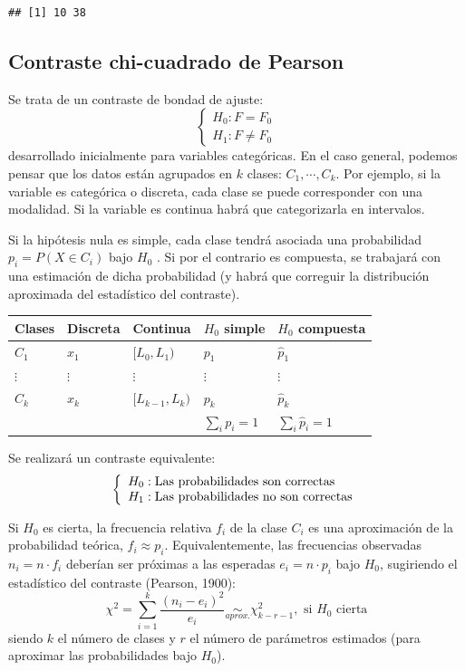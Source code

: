 \documentclass[
]{book}
\theoremstyle{break}
\theoremstyle{nonumberplain}
\begin{document}
\begin{verbatim}
## [1] 10 38
\end{verbatim}

\hypertarget{chi2test}{%
\subsection{Contraste chi-cuadrado de Pearson}\label{chi2test}}

Se trata de un contraste de bondad de ajuste:
\[\left \{
\begin{array}{l}
H_0:F=F_0\\
H_1:F\neq F_0\end{array}
\right.\]
desarrollado inicialmente para variables categóricas. En el caso general, podemos pensar que los datos están agrupados en \(k\) clases: \(C_1,\cdots,C_{k}\). Por ejemplo, si la variable es categórica o discreta, cada clase se puede corresponder con una modalidad. Si la variable es continua habrá que categorizarla en intervalos.

Si la hipótesis nula es simple, cada clase tendrá asociada una probabilidad \(p_{i}=P\left( X\in C_{i} \right)\) bajo \(H_0\) . Si por el contrario es compuesta, se trabajará con una estimación de dicha probabilidad (y habrá que correguir la distribución aproximada del estadístico del contraste).

\begin{longtable}[]{@{}lllll@{}}
\toprule
Clases & Discreta & Continua & \(H_0\) simple & \(H_0\) compuesta \\
\midrule
\endhead
\(C_1\) & \(x_1\) & \([L_0,L_1)\) & \(p_1\) & \(\hat{p}_1\) \\
\(\vdots\) & \(\vdots\) & \(\vdots\) & \(\vdots\) & \(\vdots\) \\
\(C_{k}\) & \(x_{k}\) & \([L_{k-1},L_{k})\) & \(p_{k}\) & \(\hat{p}_{k}\) \\
& & & \(\sum_{i}p_{i}=1\) & \(\sum_{i}\hat{p}_{i}=1\) \\
\bottomrule
\end{longtable}

Se realizará un contraste equivalente:
\[\left\{ \begin{array}[c]{l}
H_0:\text{Las probabilidades son correctas}\\
H_1:\text{Las probabilidades no son correctas}
\end{array} \right.\]

Si \(H_0\) es cierta, la frecuencia relativa \(f_{i}\) de la clase \(C_{i}\) es una aproximación de la probabilidad teórica, \(f_{i}\approx p_{i}\).
Equivalentemente, las frecuencias observadas \(n_{i}=n\cdot f_{i}\) deberían ser próximas a las esperadas \(e_{i}=n\cdot p_{i}\) bajo \(H_0\), sugiriendo el estadístico del contraste (Pearson, 1900):
\[\chi^2=\sum_{i=1}^{k}\frac{(n_{i}-e_{i})^2}{e_{i}}\underset{aprox.}{\sim
}\chi_{k-r-1}^2,\text{ si }H_0\text{ cierta}\]
siendo \(k\) el número de clases y \(r\) el número de parámetros estimados (para aproximar las probabilidades bajo \(H_0\)).
\end{document}
